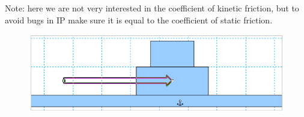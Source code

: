\documentclass[12pt]{article}
\begin{document}
Note: here we are not very interested in the coefficient of kinetic friction, but to avoid bugs in IP make sure it is equal to the coefficient of static friction.
%
\begin{figure}[H]
\includegraphics[scale=0.70]{figures/fig3.png}
\end{figure}
\end{document}
